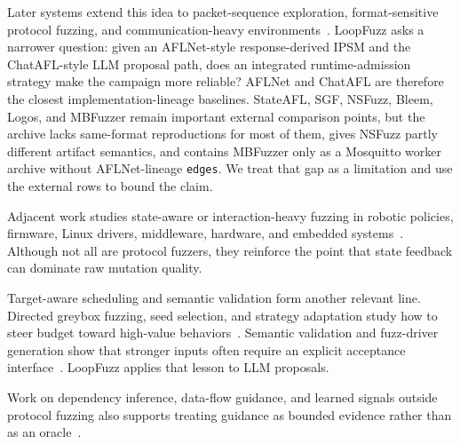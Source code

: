 \documentclass[final,5p,times,number]{elsarticle}
\begin{document}
Later systems extend this idea to packet-sequence exploration, format-sensitive protocol fuzzing, and communication-heavy environments~\cite{bleem_packet_sequence_2023,formatted_stateful_greybox_fuzzing_2024,logos_log_guided_fuzzing_2024,msgfuzzer_message_sequence_guided_2024,resolverfuzz_query_response_2024,mbfuzzer_mqtt_2025,fuzzusb_hybrid_stateful_fuzzing_2022,dtls_fuzzer_dtls_protocol_2022,edhoc_fuzzer_edhoc_protocol_2023,tron_fuzzing_linux_network_2025}. LoopFuzz asks a narrower question: given an AFLNet-style response-derived IPSM and the ChatAFL-style LLM proposal path, does an integrated runtime-admission strategy make the campaign more reliable? AFLNet and ChatAFL are therefore the closest implementation-lineage baselines. StateAFL, SGF, NSFuzz, Bleem, Logos, and MBFuzzer remain important external comparison points, but the archive lacks same-format reproductions for most of them, gives NSFuzz partly different artifact semantics, and contains MBFuzzer only as a Mosquitto worker archive without AFLNet-lineage \texttt{edges}. We treat that gap as a limitation and use the external rows to bound the claim.

Adjacent work studies state-aware or interaction-heavy fuzzing in robotic policies, firmware, Linux drivers, middleware, hardware, and embedded systems~\cite{pgfuzz_policy_guided_fuzzing_2021,android_smarttvs_vulnerability_discovery_2021,fuzzware_mmio_2022,statefuzz_linux_driver_2022,differential_fuzzing_data_distribution_2024,fuzzing_hardware_like_software_2022,coverage_guided_fuzzing_embedded_2023}. Although not all are protocol fuzzers, they reinforce the point that state feedback can dominate raw mutation quality.

Target-aware scheduling and semantic validation form another relevant line. Directed greybox fuzzing, seed selection, and strategy adaptation study how to steer budget toward high-value behaviors~\cite{directed_greybox_fuzzing_2017,windranger_blocks_2022,when_analysis_2025,seed_selection_successful_fuzzing_2021,one_fuzzing_strategy_rule_2022,regression_greybox_fuzzing_2021,efficient_errors_2022}. Semantic validation and fuzz-driver generation show that stronger inputs often require an explicit acceptance interface~\cite{one_engine_to_fuzz_em_all_2021,apicraft_fuzz_driver_2021}. LoopFuzz applies that lesson to LLM proposals.

Work on dependency inference, data-flow guidance, and learned signals outside protocol fuzzing also supports treating guidance as bounded evidence rather than as an oracle~\cite{rulf_rust_library_fuzzing_2021,smartian_analyses_2021,magneto_step_wise_approach_2024}.
\end{document}
